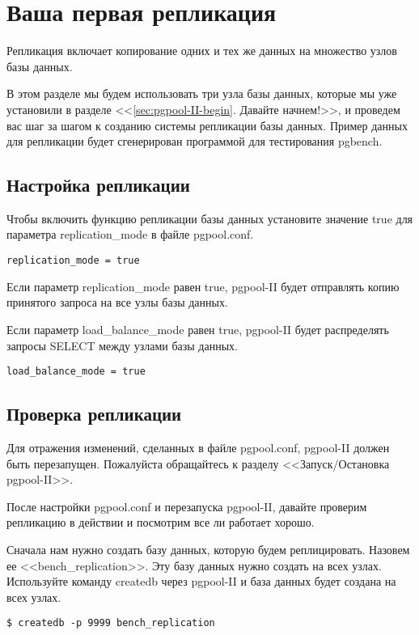 \section{Ваша первая репликация}
Репликация включает копирование одних и тех же данных на множество узлов базы данных.

В этом разделе мы будем использовать три узла базы данных, которые мы уже установили в разделе 
<<\ref{sec:pgpool-II-begin}. Давайте начнем!>>, и проведем вас шаг за шагом к созданию системы репликации базы данных. 
Пример данных для репликации будет сгенерирован программой для тестирования pgbench.

\subsection{Настройка репликации}
Чтобы включить функцию репликации базы данных установите значение true для параметра replication\_mode в файле pgpool.conf.
\begin{verbatim}
replication_mode = true
\end{verbatim}

Если параметр replication\_mode равен true, pgpool-II будет отправлять копию принятого запроса на все узлы базы данных.

Если параметр load\_balance\_mode равен true, pgpool-II будет распределять запросы SELECT между узлами базы данных.
\begin{verbatim}
load_balance_mode = true
\end{verbatim}

\subsection{Проверка репликации}
Для отражения изменений, сделанных в файле pgpool.conf, pgpool-II должен быть перезапущен. 
Пожалуйста обращайтесь к разделу <<Запуск/Остановка pgpool-II>>.

После настройки pgpool.conf и перезапуска pgpool-II, давайте проверим репликацию в действии 
и посмотрим все ли работает хорошо.

Сначала нам нужно создать базу данных, которую будем реплицировать. Назовем ее <<bench\_replication>>. 
Эту базу данных нужно создать на всех узлах. Используйте команду createdb через pgpool-II и база 
данных будет создана на всех узлах.
\begin{verbatim}
$ createdb -p 9999 bench_replication
\end{verbatim}

